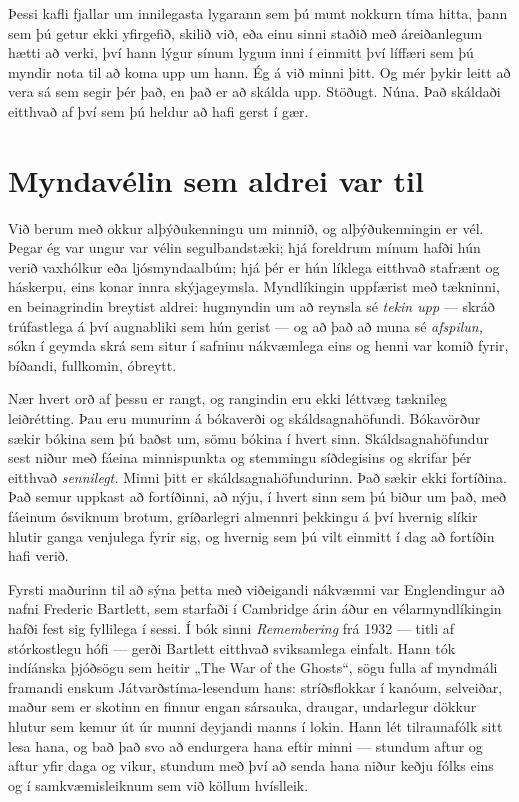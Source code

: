 Þessi kafli fjallar um innilegasta lygarann sem þú munt nokkurn tíma hitta, þann sem þú getur ekki yfirgefið, skilið við, eða einu sinni staðið með áreiðanlegum hætti að verki, því hann lýgur sínum lygum inni í einmitt því líffæri sem þú myndir nota til að koma upp um hann. Ég á við minni þitt. Og mér þykir leitt að vera sá sem segir þér það, en það er að skálda upp. Stöðugt. Núna. Það skáldaði eitthvað af því sem þú heldur að hafi gerst í gær.

\section*{Myndavélin sem aldrei var til}

Við berum með okkur alþýðukenningu um minnið, og alþýðukenningin er vél. Þegar ég var ungur var vélin segulbandstæki; hjá foreldrum mínum hafði hún verið vaxhólkur eða ljósmyndaalbúm; hjá þér er hún líklega eitthvað stafrænt og háskerpu, eins konar innra skýjageymsla. Myndlíkingin uppfærist með tækninni, en beinagrindin breytist aldrei: hugmyndin um að reynsla sé \emph{tekin upp} — skráð trúfastlega á því augnabliki sem hún gerist — og að það að muna sé \emph{afspilun,} sókn í geymda skrá sem situr í safninu nákvæmlega eins og henni var komið fyrir, bíðandi, fullkomin, óbreytt.

Nær hvert orð af þessu er rangt, og rangindin eru ekki léttvæg tæknileg leiðrétting. Þau eru munurinn á bókaverði og skáldsagnahöfundi. Bókavörður sækir bókina sem þú baðst um, sömu bókina í hvert sinn. Skáldsagnahöfundur sest niður með fáeina minnispunkta og stemmingu síðdegisins og skrifar þér eitthvað \emph{sennilegt.} Minni þitt er skáldsagnahöfundurinn. Það sækir ekki fortíðina. Það semur uppkast að fortíðinni, að nýju, í hvert sinn sem þú biður um það, með fáeinum ósviknum brotum, gríðarlegri almennri þekkingu á því hvernig slíkir hlutir ganga venjulega fyrir sig, og hvernig sem þú vilt einmitt í dag að fortíðin hafi verið.

Fyrsti maðurinn til að sýna þetta með viðeigandi nákvæmni var Englendingur að nafni Frederic Bartlett, sem starfaði í Cambridge árin áður en vélarmyndlíkingin hafði fest sig fyllilega í sessi. Í bók sinni \emph{Remembering} frá 1932 — titli af stórkostlegu hófi — gerði Bartlett eitthvað sviksamlega einfalt. Hann tók indíánska þjóðsögu sem heitir „The War of the Ghosts“, sögu fulla af myndmáli framandi enskum Játvarðstíma-lesendum hans: stríðsflokkar í kanóum, selveiðar, maður sem er skotinn en finnur engan sársauka, draugar, undarlegur dökkur hlutur sem kemur út úr munni deyjandi manns í lokin. Hann lét tilraunafólk sitt lesa hana, og bað það svo að endurgera hana eftir minni — stundum aftur og aftur yfir daga og vikur, stundum með því að senda hana niður keðju fólks eins og í samkvæmisleiknum sem við köllum hvíslleik.

